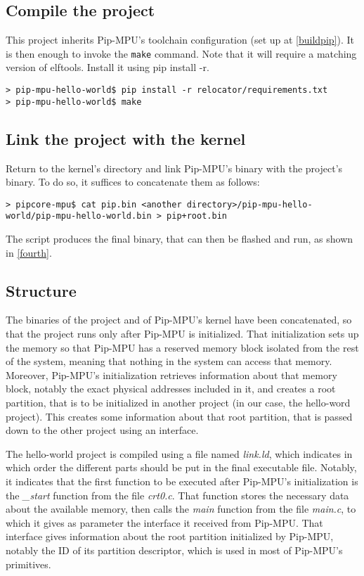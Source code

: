 \documentclass[10pt,a4paper,titlepage]{refart}
\begin{document}
\subsection{Compile the project}
This project inherits Pip-MPU's toolchain configuration (set up at \ref{buildpip}).
It is then enough to invoke the \texttt{make} command.
Note that it will require a matching version of elftools. Install it using pip install -r.

\begin{lstlisting}[style=BashStyle]
> pip-mpu-hello-world$ pip install -r relocator/requirements.txt
> pip-mpu-hello-world$ make
\end{lstlisting}

\subsection{Link the project with the kernel}
Return to the kernel's directory and link Pip-MPU's binary with the project's binary. To do so, it suffices to concatenate 
them as follows:

\begin{lstlisting}[style=BashStyle]
> pipcore-mpu$ cat pip.bin <another directory>/pip-mpu-hello-world/pip-mpu-hello-world.bin > pip+root.bin
\end{lstlisting}

The script produces the final binary, that can then be flashed and run, as shown in \cref{fourth}.

\subsection{Structure}\label{subsec:structure}
The binaries of the project and of Pip-MPU's kernel have been concatenated, so that the project runs only after Pip-MPU is 
initialized. That initialization sets up the memory so that Pip-MPU has a reserved memory block isolated from the rest of the system, 
meaning that nothing in the system can access that memory. Moreover, Pip-MPU's initialization retrieves information about that memory 
block, notably the exact physical addresses included in it, and creates a root partition, that is to be initialized in another project 
(in our case, the hello-word project). This creates some information about that root partition, that is passed down to the other 
project using an interface.

The hello-world project is compiled using a file named \textit{link.ld}, which indicates in which order the different parts should be 
put in the final executable file. Notably, it indicates that the first function to be executed after Pip-MPU's initialization is the 
\textit{\_start} function from the file \textit{crt0.c}. That function stores the necessary data about the available memory, then calls 
the \textit{main} function from the file \textit{main.c}, to which it gives as parameter the interface it received from Pip-MPU. That 
interface gives information about the root partition initialized by Pip-MPU, notably the ID of its partition descriptor, which is used 
in most of Pip-MPU's primitives. %
\end{document}

